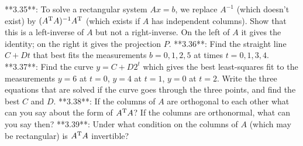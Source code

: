 

**3.35**: To solve a rectangular system \(Ax=b\), we replace \(A^{-1}\) (which doesn't exist) by \((A^{\rm T}A)^{-1}A^{\rm T}\) (which exists if \(A\) has independent columns). Show that this is a left-inverse of \(A\) but not a right-inverse. On the left of \(A\) it gives the identity; on the right it gives the projection \(P\).
**3.36**: Find the straight line \(C+Dt\) that best fits the measurements \(b=0,1,2,5\) at times \(t=0,1,3,4\).
**3.37**: Find the curve \(y=C+D2^{t}\) which gives the best least-squares fit to the measurements \(y=6\) at \(t=0\), \(y=4\) at \(t=1\), \(y=0\) at \(t=2\). Write the three equations that are solved if the curve goes through the three points, and find the best \(C\) and \(D\).
**3.38**: If the columns of \(A\) are orthogonal to each other what can you say about the form of \(A^{\rm T}A\)? If the columns are orthonormal, what can you say then?
**3.39**: Under what condition on the columns of \(A\) (which may be rectangular) is \(A^{\rm T}A\) invertible?